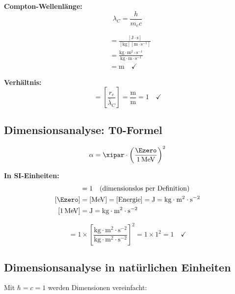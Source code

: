 	\textbf{Compton-Wellenlänge:}
	\begin{equation}
		\lambda_C = \frac{h}{m_e c}
	\end{equation}
	
	\begin{align}
		[\lambda_C] &= \frac{[\text{J}\cdot\text{s}]}{[\text{kg}][\text{m}\cdot\text{s}^{-1}]} \\
		&= \frac{\text{kg}\cdot\text{m}^2\cdot\text{s}^{-1}}{\text{kg}\cdot\text{m}\cdot\text{s}^{-1}} \\
		&= \text{m} \quad \checkmark
	\end{align}
	
	\textbf{Verhältnis:}
	\begin{equation}
		[\alpha] = \left[\frac{r_e}{\bar\lambda_C}\right] = \frac{\text{m}}{\text{m}} = 1 \quad \checkmark
	\end{equation}
	
	\subsection{Dimensionsanalyse: T0-Formel}
	
	\begin{equation}
		\alpha = \xipar \cdot \left(\frac{\Ezero}{1\,\text{MeV}}\right)^2
	\end{equation}
	
	\textbf{In SI-Einheiten:}
	\begin{align}
		[\xipar] &= 1 \quad \text{(dimensionslos per Definition)} \\
		[\Ezero] &= [\text{MeV}] = [\text{Energie}] = \text{J} = \text{kg}\cdot\text{m}^2\cdot\text{s}^{-2} \\
		[1\,\text{MeV}] &= \text{J} = \text{kg}\cdot\text{m}^2\cdot\text{s}^{-2}
	\end{align}
	
	\begin{equation}
		[\alpha] = 1 \times \left[\frac{\text{kg}\cdot\text{m}^2\cdot\text{s}^{-2}}{\text{kg}\cdot\text{m}^2\cdot\text{s}^{-2}}\right]^2 = 1 \times 1^2 = 1 \quad \checkmark
	\end{equation}
	
	\subsection{Dimensionsanalyse in natürlichen Einheiten}
	
	Mit $\hbar = c = 1$ werden Dimensionen vereinfacht:
	
